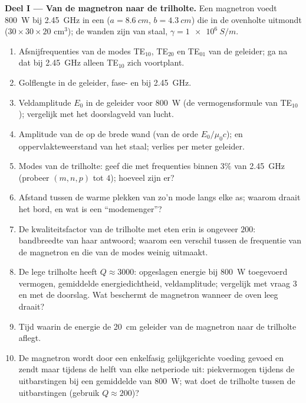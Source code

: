 \begin{problem}
\label{pb:b2:guided-waves:1}

\medskip
\noindent\textbf{Deel I --- Van de magnetron naar de trilholte.}
Een magnetron voedt \qty{800}{W} bij \qty{2.45}{GHz} in een  ($a = \qty{8.6}{cm}$, $b = \qty{4.3}{cm}$) die in de ovenholte
uitmondt ($30 \times 30 \times 20$ cm$^3$); de wanden zijn van staal,
$\gamma = \qty{1e6}{S/m}$.
\begin{enumerate}
  \item Afsnijfrequenties van de modes TE$_{10}$, TE$_{20}$ en TE$_{01}$ van
        de geleider; ga na dat bij \qty{2.45}{GHz} alleen TE$_{10}$ zich
        voortplant.
  \item Golflengte in de geleider, fase- en  bij \qty{2.45}{GHz}.
  \item Veldamplitude $E_0$ in de geleider voor \qty{800}{W} (de
        vermogensformule van TE$_{10}$); vergelijk met het doorslagveld van
        lucht.
  \item Amplitude van de  op de brede wand (van de orde
        $E_0/\mu_0c$);  en oppervlakteweerstand van het staal;
        verlies per meter geleider.
  \item Modes van de trilholte: geef die met frequenties binnen $3\%$ van
        \qty{2.45}{GHz} (probeer $(m, n, p)$ tot $4$); hoeveel zijn er?
  \item Afstand tussen de warme plekken van zo'n mode langs elke as; waarom
        draait het bord, en wat is een ``modemenger''?
  \item De kwaliteitsfactor van de trilholte met eten erin is ongeveer
        $200$: bandbreedte van haar antwoord; waarom een verschil tussen de
        frequentie van de magnetron en die van de modes weinig uitmaakt.
  \item De lege trilholte heeft $Q \approx 3000$: opgeslagen energie bij
        \qty{800}{W} toegevoerd vermogen, gemiddelde energiedichtheid,
        veldamplitude; vergelijk met vraag 3 en met de doorslag. Wat
        beschermt de magnetron wanneer de oven leeg draait?
  \item Tijd waarin de energie de \qty{20}{cm} geleider van de magnetron
        naar de trilholte aflegt.
  \item De magnetron wordt door een enkelfasig gelijkgerichte voeding gevoed
        en zendt maar tijdens de helft van elke netperiode uit: piekvermogen
        tijdens de uitbarstingen bij een gemiddelde van \qty{800}{W}; wat
        doet de trilholte tussen de uitbarstingen (gebruik $Q \approx 200$)?
\end{enumerate}


\end{problem}
